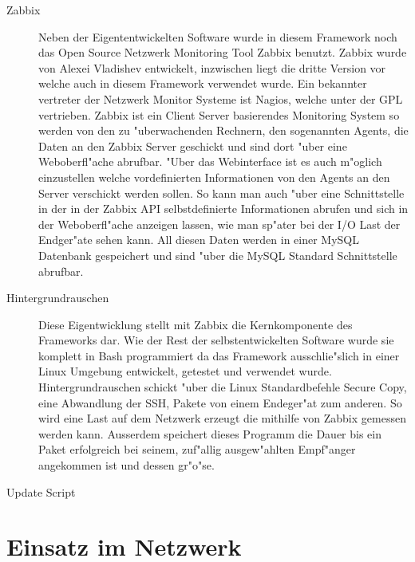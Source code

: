 \begin{description}
\item[Zabbix]Neben der Eigententwickelten Software wurde in diesem Framework noch das Open Source Netzwerk Monitoring %
Tool Zabbix benutzt. Zabbix wurde von Alexei Vladishev entwickelt, inzwischen liegt die dritte Version %
vor welche auch in diesem Framework verwendet wurde. Ein bekannter vertreter der Netzwerk Monitor Systeme %
ist Nagios, welche unter der GPL vertrieben. Zabbix ist ein Client Server basierendes Monitoring System %
so werden von den zu "uberwachenden Rechnern, den sogenannten Agents, die Daten an den Zabbix Server geschickt und sind dort "uber %
eine Weboberfl"ache abrufbar. "Uber das Webinterface ist es auch m"oglich einzustellen welche vordefinierten Informationen %
von den Agents an den Server verschickt werden sollen. So kann man auch "uber eine Schnittstelle in der %
in der Zabbix API selbstdefinierte Informationen abrufen und sich in der Weboberfl"ache anzeigen lassen, %
wie man sp"ater bei der I/O Last der Endger"ate sehen kann. All diesen Daten werden in einer MySQL Datenbank %
gespeichert und sind "uber die MySQL Standard Schnittstelle abrufbar.

\item[Hintergrundrauschen]Diese Eigentwicklung stellt mit Zabbix die Kernkomponente des Frameworks dar. Wie %
der Rest der selbstentwickelten Software wurde sie komplett in Bash programmiert da das Framework ausschlie"slich %
in einer Linux Umgebung entwickelt, getestet und verwendet wurde. Hintergrundrauschen schickt "uber die Linux %
Standardbefehle Secure Copy, eine Abwandlung der SSH, Pakete von einem Endeger"at zum anderen. So wird eine %
Last auf dem Netzwerk erzeugt die mithilfe von Zabbix gemessen werden kann. Ausserdem speichert dieses Programm %
die Dauer bis ein Paket erfolgreich bei seinem, zuf"allig ausgew"ahlten Empf"anger angekommen ist und dessen gr"o"se. %

\item[Update Script]     

\end{description}
\section{Einsatz im Netzwerk} 
\label{sec:einsatzImNetzwerk}

